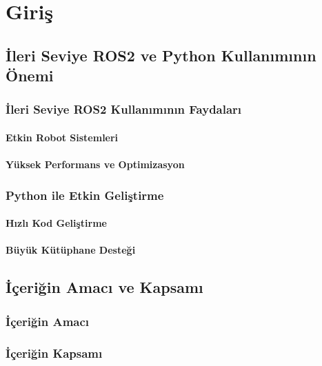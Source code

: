 \chapter{Giriş}

\section{İleri Seviye ROS2 ve Python Kullanımının Önemi}
\subsection{İleri Seviye ROS2 Kullanımının Faydaları}
\subsubsection{Etkin Robot Sistemleri}
\lipsum[1] %

\subsubsection{Yüksek Performans ve Optimizasyon}
\lipsum[2] %

\subsection{Python ile Etkin Geliştirme}
\subsubsection{Hızlı Kod Geliştirme}
\lipsum[3] %

\subsubsection{Büyük Kütüphane Desteği}
\lipsum[4] %

\section{İçeriğin Amacı ve Kapsamı}
\subsection{İçeriğin Amacı}
\lipsum[5] %

\subsection{İçeriğin Kapsamı}
\lipsum[6] %
